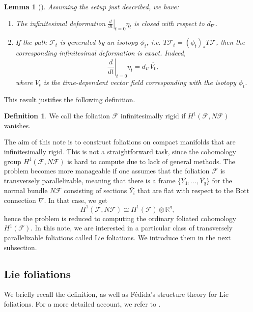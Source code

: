 \documentclass[11pt, letterpaper, oneside,reqno]{amsart}
\theoremstyle{plain}
\newtheorem{lemma}[thm]{Lemma}
\theoremstyle{underline}
\theoremstyle{definition}
\newtheorem{defi}[thm]{Definition}
\theoremstyle{remark}
\begin{document}
	\begin{lemma}[\cite{Heitsch}]
		\label{lem:first-order-fol}
		Assuming the setup just described, we have:
		\begin{enumerate}
			\item The infinitesimal deformation $\left.\frac{d}{dt}\right|_{t=0}\eta_t$ is closed with respect to $d_{\nabla}$.
			\item If the path $\mathcal{F}_t$ is generated by an isotopy $\phi_t$, i.e. $T\mathcal{F}_t=(\phi_t)_{*}T\mathcal{F}$, then the corresponding infinitesimal deformation is exact. Indeed,
			\[
			\left.\frac{d}{dt}\right|_{t=0}\eta_t=d_{\nabla}\overline{V_0},
			\]
			where $V_t$ is the time-dependent vector field corresponding with the isotopy $\phi_t$.
		\end{enumerate}
	\end{lemma}
	
	This result justifies the following definition.
	
	\begin{defi}
		We call the foliation $\mathcal{F}$ infinitesimally rigid if $H^{1}(\mathcal{F},N\mathcal{F})$ vanishes.
	\end{defi}
	
	The aim of this note is to construct foliations on compact manifolds that are infinitesimally rigid. This is not a straightforward task, since the cohomology group $H^{1}(\mathcal{F},N\mathcal{F})$ is hard to compute due to lack of general methods. The problem becomes more manageable if one assumes that the foliation $\mathcal{F}$ is transversely parallelizable, meaning that there is a frame $\{\overline{Y_1},\ldots,\overline{Y_q}\}$ for the normal bundle $N\mathcal{F}$ consisting of sections $\overline{Y_i}$ that are flat with respect to the Bott connection $\nabla$. In that case, we get 
	\[
	H^{1}(\mathcal{F},N\mathcal{F})\cong H^{1}(\mathcal{F})\otimes\mathbb{R}^{q},
	\]
	hence the problem is reduced to computing the ordinary foliated cohomology $H^1(\mathcal{F})$. In this note, we are interested in a particular class of transversely parallelizable foliations called Lie foliations. We introduce them in the next subsection.
	
	
	
	\subsection{Lie foliations}
	We briefly recall the definition, as well as Fédida's structure theory for Lie foliations.  For a more detailed account, we refer to \cite[\S 4.3.1]{Moerdijk}.
	
\end{document}
